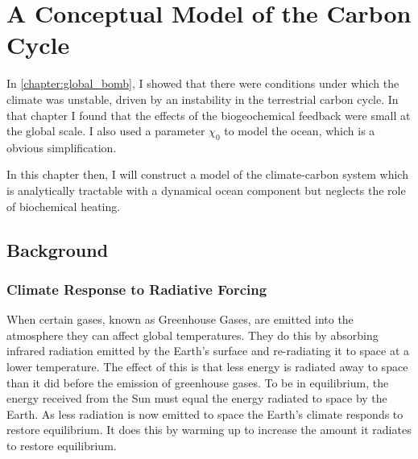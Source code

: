 \chapter{A Conceptual Model of the Carbon Cycle}
\label{chapter:conceptual_carbon_cycle}
\graphicspath{{box_ocean/figs/}}

In \cref{chapter:global_bomb}, I showed that there were conditions under which the climate was unstable,
driven by an instability in the terrestrial carbon cycle. In that chapter I found that the effects of
the biogeochemical feedback were small at the global scale. I also used a parameter $\chi_0$ to model the ocean,
which is a obvious simplification.

In this chapter then, I will construct a model of the climate-carbon system which is analytically tractable
with a dynamical ocean component but neglects the role of biochemical heating.

\section{Background}

\subsection{Climate Response to Radiative Forcing}
When certain gases, known as Greenhouse Gases, are emitted into the atmosphere they can affect global temperatures.
They do this by absorbing infrared radiation emitted by the Earth's surface and re-radiating it to space at a lower temperature.
The effect of this is that less energy is radiated away to space than it did before the emission of greenhouse gases. To be in
equilibrium, the energy received from the Sun must equal the energy radiated to space by the Earth. As less radiation is now
emitted to space the Earth's climate responds to restore equilibrium. It does this by warming up to increase the amount it
radiates to restore equilibrium.

